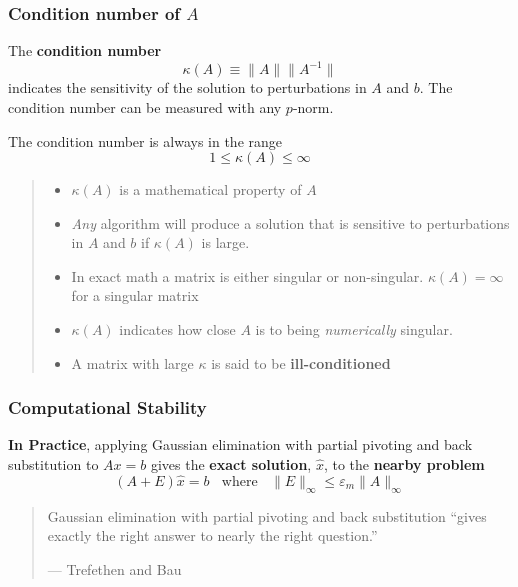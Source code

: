 \documentclass[10pt]{beamer}
\newcommand{\norm}[1]{{\ensuremath{{\|#1\|}}}}
\newcommand{\epsm}{\ensuremath{\varepsilon_m}}
\begin{document}
\begin{frame}
\frametitle{Condition number of $A$}

The \textbf{condition number}
\begin{equation*}
    \kappa(A) \equiv \norm{A}\norm{A^{-1}}
\end{equation*}
indicates the sensitivity of the solution to perturbations in $A$ and $b$. The
condition number can be measured with any $p$-norm.

The condition number is always in the range
\begin{equation*}
    1 \le \kappa(A) \le \infty
\end{equation*}
\begin{quote}
\begin{itemize}
    \item   $\kappa(A)$ is a mathematical property of $A$
    \item   \emph{Any} algorithm will produce a solution that is sensitive
            to perturbations in $A$ and $b$ if $\kappa(A)$ is large.
    \item   In exact math a matrix is either singular or non-singular.
            $\kappa(A)=\infty$ for a singular matrix
    \item   $\kappa(A)$ indicates how close
            $A$ is to being \emph{numerically} singular.
    \item   A matrix with large $\kappa$ is said to be \textbf{ill-conditioned}
\end{itemize}
\end{quote}

\end{frame}
\begin{frame}
\frametitle{Computational Stability}

\textbf{In Practice}, applying Gaussian elimination with
partial pivoting and back substitution to $Ax=b$ gives the \textbf{exact
solution}, $\hat{x}$, to the \textbf{nearby problem}
\begin{equation*}
    (A + E)\hat{x} = b
    \ \ \ \
    \text{where}
    \ \ \ \
    \|E\|_{\infty} \le  \epsm \|A\|_{\infty}
\end{equation*}
\begin{quote}
    Gaussian elimination with partial pivoting and back substitution
    ``gives exactly the right answer to nearly the right question.''
    \par\hfill{--- Trefethen and Bau}
\end{quote}

\end{frame}
\end{document}
